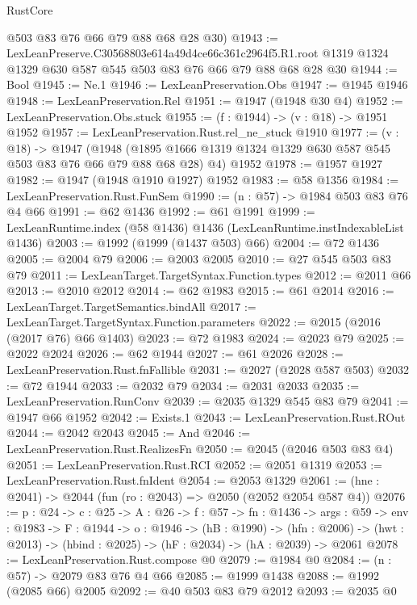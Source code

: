 \begin{lexlean}{RustCore}
\begin{coremodule}
      @503
      @83
      @76
      @66
      @79
      @88
      @68
      @28
      @30)
@1943 := LexLeanPreserve.C30568803e614a49d4ce66c361c2964f5.R1.root
    @1319
    @1324
    @1329
    @630
    @587
    @545
    @503
    @83
    @76
    @66
    @79
    @88
    @68
    @28
    @30
@1944 := Bool
@1945 := Ne.{1}
@1946 := LexLeanPreservation.Obs
@1947 := @1945 @1946
@1948 := LexLeanPreservation.Rel
@1951 := @1947 (@1948 @30 @4)
@1952 := LexLeanPreservation.Obs.stuck
@1955 := (f : @1944) -> (v : @18) -> @1951 @1952
@1957 := LexLeanPreservation.Rust.rel_ne_stuck @1910
@1977 := (v : @18) ->
  @1947
    (@1948 (@1895 @1666 @1319 @1324 @1329 @630 @587 @545 @503 @83 @76 @66 @79 @88 @68 @28) @4)
    @1952
@1978 := @1957 @1927
@1982 := @1947 (@1948 @1910 @1927) @1952
@1983 := @58 @1356
@1984 := LexLeanPreservation.Rust.FunSem
@1990 := (n : @57) -> @1984 @503 @83 @76 @4 @66
@1991 := @62 @1436
@1992 := @61 @1991
@1999 := LexLeanRuntime.index (@58 @1436) @1436 (LexLeanRuntime.instIndexableList @1436)
@2003 := @1992 (@1999 (@1437 @503) @66)
@2004 := @72 @1436
@2005 := @2004 @79
@2006 := @2003 @2005
@2010 := @27 @545 @503 @83 @79
@2011 := LexLeanTarget.TargetSyntax.Function.types
@2012 := @2011 @66
@2013 := @2010 @2012
@2014 := @62 @1983
@2015 := @61 @2014
@2016 := LexLeanTarget.TargetSemantics.bindAll
@2017 := LexLeanTarget.TargetSyntax.Function.parameters
@2022 := @2015 (@2016 (@2017 @76) @66 @1403)
@2023 := @72 @1983
@2024 := @2023 @79
@2025 := @2022 @2024
@2026 := @62 @1944
@2027 := @61 @2026
@2028 := LexLeanPreservation.Rust.fnFallible
@2031 := @2027 (@2028 @587 @503)
@2032 := @72 @1944
@2033 := @2032 @79
@2034 := @2031 @2033
@2035 := LexLeanPreservation.RunConv
@2039 := @2035 @1329 @545 @83 @79
@2041 := @1947 @66 @1952
@2042 := Exists.{1}
@2043 := LexLeanPreservation.Rust.ROut
@2044 := @2042 @2043
@2045 := And
@2046 := LexLeanPreservation.Rust.RealizesFn
@2050 := @2045 (@2046 @503 @83 @4)
@2051 := LexLeanPreservation.Rust.RCI
@2052 := @2051 @1319
@2053 := LexLeanPreservation.Rust.fnIdent
@2054 := @2053 @1329
@2061 := (hne : @2041) -> @2044 (fun (ro : @2043) => @2050 (@2052 @2054 @587 @4))
@2076 := {p : @24} ->
  {c : @25} ->
  {A : @26} ->
  {f : @57} ->
  {fn : @1436} ->
  {args : @59} ->
  {env : @1983} ->
  {F : @1944} ->
  {o : @1946} ->
  (hB : @1990) ->
  (hfn : @2006) -> (hwt : @2013) -> (hbind : @2025) -> (hF : @2034) -> (hA : @2039) -> @2061
@2078 := LexLeanPreservation.Rust.compose @0
@2079 := @1984 @0
@2084 := (n : @57) -> @2079 @83 @76 @4 @66
@2085 := @1999 @1438
@2088 := @1992 (@2085 @66) @2005
@2092 := @40 @503 @83 @79 @2012
@2093 := @2035 @0

\end{coremodule}
\end{lexlean}
